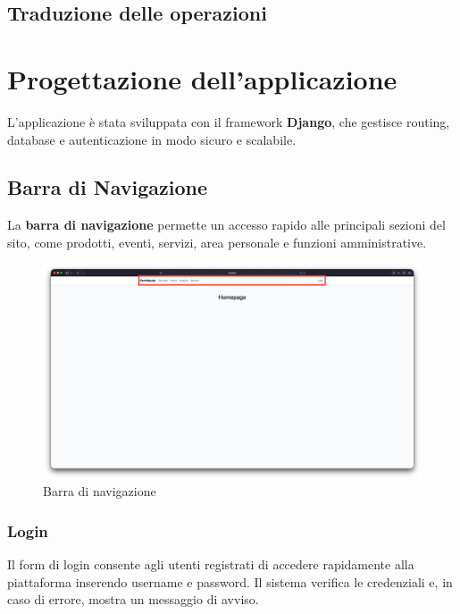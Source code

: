 \documentclass[a4paper,12pt]{report}
\begin{document}
\section{Traduzione delle operazioni}

\chapter{Progettazione dell'applicazione}
L'applicazione è stata sviluppata con il framework \textbf{Django}, che gestisce routing, 
database e autenticazione in modo sicuro e scalabile.

\section{Barra di Navigazione}
La \textbf{barra di navigazione} permette un accesso rapido alle principali sezioni del sito, 
come prodotti, eventi, servizi, area personale e funzioni amministrative.

\begin{figure}[H]
    \centering
    \includegraphics[width=\textwidth, trim=0 0 0 0]{./img/navbar.png}
    \caption{Barra di navigazione}
    \label{fig:navbar}
\end{figure}

\newpage
\subsection*{Login}

Il form di login consente agli utenti registrati di accedere rapidamente alla piattaforma inserendo username e 
password. Il sistema verifica le credenziali e, in caso di errore, mostra un messaggio di avviso.
\end{document}
